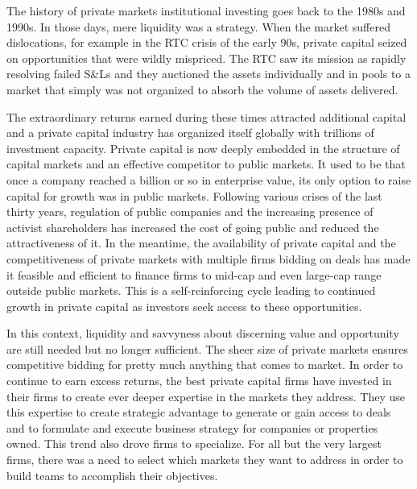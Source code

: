 \documentclass[12pt,english]{article}\usepackage[]{graphicx}\usepackage[]{color}
\begin{document}
The history of private markets institutional investing goes back to
the 1980s and 1990s. In those days, mere liquidity was a strategy.
When the market suffered dislocations, for example in the RTC crisis
of the early 90s, private capital seized on opportunities that were
wildly mispriced. The RTC saw its mission as rapidly resolving failed
S\&Ls and they auctioned the assets individually and in pools to a
market that simply was not organized to absorb the volume of assets
delivered. 

The extraordinary returns earned during these times attracted additional
capital and a private capital industry has organized itself globally
with trillions of investment capacity. Private capital is now deeply
embedded in the structure of capital markets and an effective competitor
to public markets. It used to be that once a company reached a billion
or so in enterprise value, its only option to raise capital for growth
was in public markets. Following various crises of the last thirty
years, regulation of public companies and the increasing presence
of activist shareholders has increased the cost of going public and
reduced the attractiveness of it. In the meantime, the availability
of private capital and the competitiveness of private markets with
multiple firms bidding on deals has made it feasible and efficient
to finance firms to mid-cap and even large-cap range outside public
markets. This is a self-reinforcing cycle leading to continued growth
in private capital as investors seek access to these opportunities. 

In this context, liquidity and savvyness about discerning value and
opportunity are still needed but no longer sufficient. The sheer size
of private markets ensures competitive bidding for pretty much anything
that comes to market. In order to continue to earn excess returns,
the best private capital firms have invested in their firms to create
ever deeper expertise in the markets they address. They use this expertise
to create strategic advantage to generate or gain access to deals
and to formulate and execute business strategy for companies or properties
owned. This trend also drove firms to specialize. For all but the
very largest firms, there was a need to select which markets they
want to address in order to build teams to accomplish their objectives.
\end{document}
